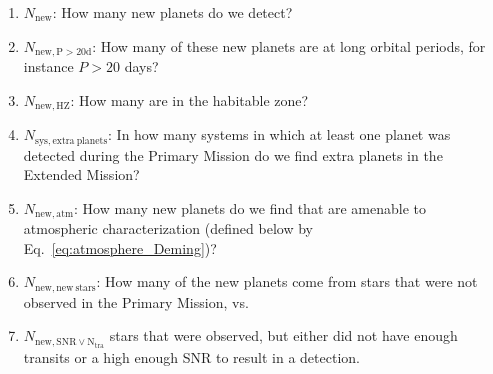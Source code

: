 \begin{enumerate}
	\item $N_\mathrm{new}$: How many new planets do we detect?
	\item $N_\mathrm{new,P>20d}$: How many of these new planets are at long orbital periods, for instance $P>20$ days?
	\item $N_\mathrm{new,HZ}$: How many are in the habitable zone?
	\item $N_\mathrm{sys,extra\ planets}$: In how many systems in which at least one planet was detected during the Primary Mission do we find extra planets in the Extended Mission?
	\item $N_\mathrm{new,atm}$: How many new planets do we find that are amenable to atmospheric characterization (defined below by Eq.~\ref{eq:atmosphere_Deming})?
	\item $N_\mathrm{new,new\ stars}$: How many of the new planets come from stars that were not observed in the Primary Mission, vs. 
	\item $N_\mathrm{new,SNR\lor N_{tra}}$ stars that were observed, but either did not have enough transits or a high enough SNR to result in a detection.
\end{enumerate}
